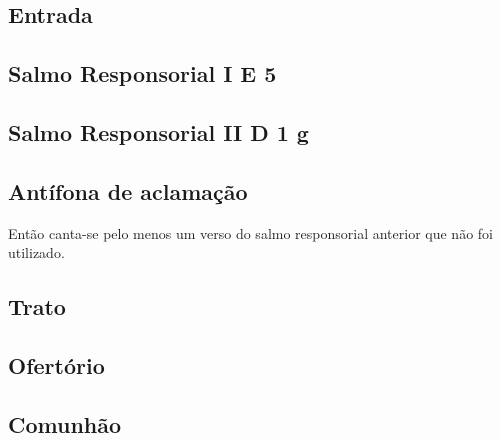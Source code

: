 
\subsection{Entrada}\label{subsection:tempus-quadragesimae/dominica-1/introitus}

\AllowPageFlush

\subsection[Salmo Responsorial I]{Salmo Responsorial I \textmd{E 5}}\label{subsection:tempus-quadragesimae/dominica-1/psalmus-responsorius-1}

\AllowPageFlush

\subsection[Salmo Responsorial II]{Salmo Responsorial II \textmd{D 1 g}}\label{subsection:tempus-quadragesimae/dominica-1/psalmus-responsorius-2}

\AllowPageFlush

\subsection{Antífona de aclamação}\label{subsection:tempus-quadragesimae/dominica-1/antiphona-acclamationis}
\begin{rubrica}
  Então canta-se pelo menos um verso do salmo responsorial anterior que não foi utilizado.
\end{rubrica}

\subsection{Trato}\label{subsection:tempus-quadragesimae/dominica-1/tractus}

\AllowPageFlush

\subsection{Ofertório}\label{subsection:tempus-quadragesimae/dominica-1/offertorium}

\AllowPageFlush

\subsection{Comunhão}\label{subsection:tempus-quadragesimae/dominica-1/communio}
